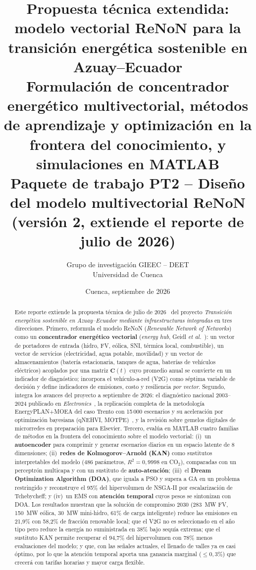 \documentclass[11pt,a4paper]{article}
\title{\color{UCblue}\textbf{Propuesta t\'ecnica extendida: modelo vectorial ReNoN para la
transici\'on energ\'etica sostenible en Azuay--Ecuador}\\[4pt]
\large Formulaci\'on de concentrador energ\'etico multivectorial, m\'etodos de aprendizaje y
optimizaci\'on en la frontera del conocimiento, y simulaciones en MATLAB\\[2pt]
\normalsize Paquete de trabajo PT2 -- Dise\~no del modelo multivectorial ReNoN (versi\'on 2, extiende el reporte de julio de 2026)}
\author{Grupo de investigaci\'on GIEEC -- DEET\\ Universidad de Cuenca}
\date{Cuenca, septiembre de 2026}
\newcommand{\vect}[1]{\bm{#1}}
\newcommand{\CO}{CO$_2$}
\begin{document}
\maketitle
\thispagestyle{fancy}

\begin{abstract}
\noindent Este reporte extiende la propuesta t\'ecnica de julio de 2026~\cite{reporte_v1} del
proyecto \emph{Transici\'on energ\'etica sostenible en Azuay--Ecuador mediante
infraestructuras integradas} en tres direcciones. Primero, reformula el modelo ReNoN
(\emph{Renewable Network of Networks}) como un \textbf{concentrador energ\'etico
vectorial} (\emph{energy hub}, Geidl \emph{et al.}~\cite{geidl2007hub}): un vector de
portadores de entrada (hidro, FV, e\'olica, SNI, t\'ermica local, combustible), un vector
de servicios (electricidad, agua potable, movilidad) y un vector de almacenamientos
(bater\'ia estacionaria, tanques de agua, bater\'ias de veh\'iculos el\'ectricos) acoplados
por una matriz $\vect{C}(t)$ cuyo promedio anual se convierte en un indicador de
diagn\'ostico; incorpora el veh\'iculo-a-red (V2G) como s\'eptima variable de decisi\'on y
define indicadores de emisiones, costo y resiliencia \emph{por vector}. Segundo, integra
los avances del proyecto a septiembre de 2026: el diagn\'ostico nacional 2003--2024
publicado en \emph{Electronics}~\cite{ortega2026}, la replicaci\'on completa de la
metodolog\'ia EnergyPLAN$+$MOEA del caso Trento con 15\,000 escenarios y su aceleraci\'on
por optimizaci\'on bayesiana (qNEHVI, MOTPE)~\cite{loza2026}, y la revisi\'on sobre gemelos
digitales de microrredes en preparaci\'on para Elsevier. Tercero, eval\'ua en MATLAB
cuatro familias de m\'etodos en la frontera del conocimiento sobre el modelo vectorial:
(i)~un \textbf{autoencoder} para comprimir y generar escenarios diarios en un espacio
latente de 8 dimensiones; (ii)~\textbf{redes de Kolmogorov--Arnold (KAN)} como sustitutos
interpretables del modelo (486 par\'ametros, $R^2=0{,}9998$ en \CO), comparadas con un
perceptr\'on multicapa y con un sustituto de \textbf{auto-atenci\'on}; (iii)~el
\textbf{Dream Optimization Algorithm (DOA)}, que iguala a PSO y supera a GA en un problema
restringido y reconstruye el 95\% del hipervolumen de NSGA-II por escalarizaci\'on de
Tchebycheff; y (iv)~un EMS con \textbf{atenci\'on temporal} cuyos pesos se sintonizan con
DOA. Los resultados muestran que la soluci\'on de compromiso 2030 (283~MW FV, 150~MW
e\'olica, 30~MW mini-hidro, 61\% de carga inteligente) reduce las emisiones en 21,9\% con
58,2\% de fracci\'on renovable local; que el V2G no es seleccionado en el a\~no tipo pero
reduce la energ\'ia no suministrada en 38\% bajo sequ\'ia extrema; que el sustituto KAN
permite recuperar el 94,7\% del hipervolumen con 78\% menos evaluaciones del modelo; y
que, con las se\~nales actuales, el llenado de valles ya es casi \'optimo, por lo que la
atenci\'on temporal aporta una ganancia marginal ($\le 0{,}3\%$) que crecer\'a con tarifas
horarias y mayor carga flexible.
\end{abstract}
\end{document}
